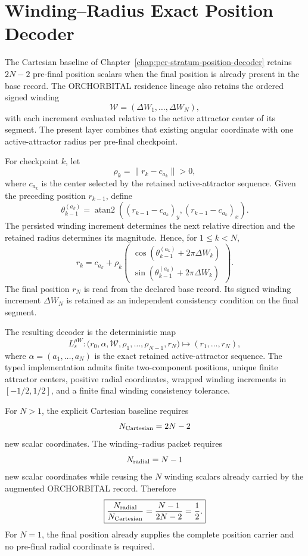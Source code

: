 \chapter{Winding--Radius Exact Position Decoder}
\label{chap:winding-radius-position-decoder}

The Cartesian baseline of Chapter~\ref{chap:per-stratum-position-decoder} retains $2N-2$ pre-final position scalars when the final position is already present in the base record. The ORCHORBITAL residence lineage also retains the ordered signed winding
\[
\mathcal W=(\Delta W_1,\ldots,\Delta W_N),
\]
with each increment evaluated relative to the active attractor center of its segment. The present layer combines that existing angular coordinate with one active-attractor radius per pre-final checkpoint.

For checkpoint $k$, let
\[
\rho_k=\|r_k-c_{a_k}\|>0,
\]
where $c_{a_k}$ is the center selected by the retained active-attractor sequence. Given the preceding position $r_{k-1}$, define
\[
\theta_{k-1}^{(a_k)}
=\operatorname{atan2}\!\left(
(r_{k-1}-c_{a_k})_y,
(r_{k-1}-c_{a_k})_x
\right).
\]
The persisted winding increment determines the next relative direction and the retained radius determines its magnitude. Hence, for $1\le k<N$,
\[
\boxed{
r_k=c_{a_k}+\rho_k
\begin{pmatrix}
\cos\!\left(\theta_{k-1}^{(a_k)}+2\pi\Delta W_k\right)\\
\sin\!\left(\theta_{k-1}^{(a_k)}+2\pi\Delta W_k\right)
\end{pmatrix}.
}
\]
The final position $r_N$ is read from the declared base record. Its signed winding increment $\Delta W_N$ is retained as an independent consistency condition on the final segment.

The resulting decoder is the deterministic map
\[
\boxed{
L_s^{\rho W}:
\bigl(r_0,\alpha,\mathcal W,\rho_1,\ldots,\rho_{N-1},r_N\bigr)
\longmapsto
(r_1,\ldots,r_N),
}
\]
where $\alpha=(a_1,\ldots,a_N)$ is the exact retained active-attractor sequence. The typed implementation admits finite two-component positions, unique finite attractor centers, positive radial coordinates, wrapped winding increments in $[-1/2,1/2]$, and a finite final winding consistency tolerance.

For $N>1$, the explicit Cartesian baseline requires
\[
N_{\rm Cartesian}=2N-2
\]
new scalar coordinates. The winding--radius packet requires
\[
N_{\rm radial}=N-1
\]
new scalar coordinates while reusing the $N$ winding scalars already carried by the augmented ORCHORBITAL record. Therefore
\[
\boxed{
\frac{N_{\rm radial}}{N_{\rm Cartesian}}
=\frac{N-1}{2N-2}
=\frac12.
}
\]
For $N=1$, the final position already supplies the complete position carrier and no pre-final radial coordinate is required.

